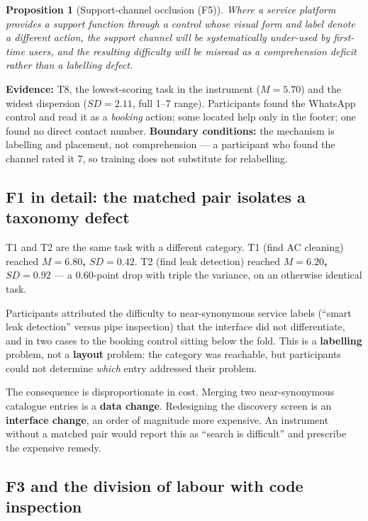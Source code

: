 \documentclass[]{interact}
\theoremstyle{plain}
\newtheorem{proposition}[section]{Proposition}
\begin{document}
\begin{proposition}[Support-channel occlusion (F5)]
\label{prop:F5}
\emph{Where a service platform provides a support function through a control whose visual form and label
denote a different action, the support channel will be systematically under-used by first-time users,
and the resulting difficulty will be misread as a comprehension deficit rather than a labelling defect.}
\end{proposition}

\noindent\textbf{Evidence:} T8, the lowest-scoring task in the instrument ($M = 5.70$) and the widest
dispersion ($SD = 2.11$, full 1--7 range). Participants found the WhatsApp control and read it as a
\emph{booking} action; some located help only in the footer; one found no direct contact number.
\textbf{Boundary conditions:} the mechanism is labelling and placement, not comprehension --- a
participant who found the channel rated it 7, so training does not substitute for relabelling.

\subsection{F1 in detail: the matched pair isolates a taxonomy defect}
\label{sec:matched}

T1 and T2 are the same task with a different category. T1 (find AC cleaning) reached \textbf{$M = 6.80$,
$SD = 0.42$}. T2 (find leak detection) reached \textbf{$M = 6.20$, $SD = 0.92$} --- a 0.60-point drop
with triple the variance, on an otherwise identical task.

Participants attributed the difficulty to near-synonymous service labels (``smart leak detection''
versus pipe inspection) that the interface did not differentiate, and in two cases to the booking
control sitting below the fold. This is a \textbf{labelling} problem, not a \textbf{layout} problem: the
category was reachable, but participants could not determine \emph{which} entry addressed their problem.

The consequence is disproportionate in cost. Merging two near-synonymous catalogue entries is a
\textbf{data change}. Redesigning the discovery screen is an \textbf{interface change}, an order of
magnitude more expensive. An instrument without a matched pair would report this as ``search is
difficult'' and prescribe the expensive remedy.

\subsection{F3 and the division of labour with code inspection}
\label{sec:division}
\end{document}
